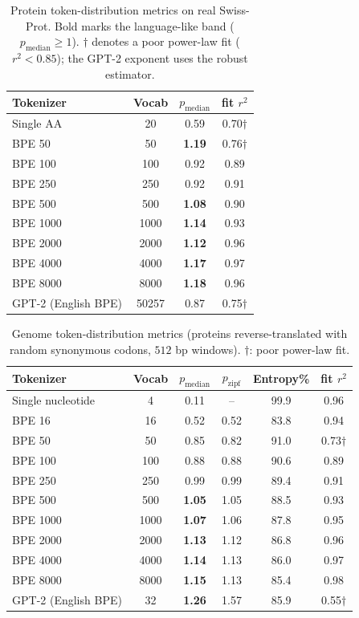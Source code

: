 \documentclass[11pt]{article}
\begin{document}
\begin{table}[t]
\centering
\caption{Protein token-distribution metrics on real Swiss-Prot. Bold marks the
language-like band ($p_\text{median} \ge 1$). $\dagger$ denotes a poor power-law
fit ($r^2 < 0.85$); the GPT-2 exponent uses the robust estimator.}
\label{tab:protein}
\begin{tabular}{lccc}
\toprule
Tokenizer & Vocab & $p_\text{median}$ & fit $r^2$ \\
\midrule
Single AA              & 20    & 0.59 & 0.70$\dagger$ \\
BPE 50                 & 50    & \textbf{1.19} & 0.76$\dagger$ \\
BPE 100                & 100   & 0.92 & 0.89 \\
BPE 250                & 250   & 0.92 & 0.91 \\
BPE 500                & 500   & \textbf{1.08} & 0.90 \\
BPE 1000               & 1000  & \textbf{1.14} & 0.93 \\
BPE 2000               & 2000  & \textbf{1.12} & 0.96 \\
BPE 4000               & 4000  & \textbf{1.17} & 0.97 \\
BPE 8000               & 8000  & \textbf{1.18} & 0.96 \\
GPT-2 (English BPE)    & 50257 & 0.87 & 0.75$\dagger$ \\
\bottomrule
\end{tabular}
\end{table}

\begin{table}[t]
\centering
\caption{Genome token-distribution metrics (proteins reverse-translated with
random synonymous codons, $512$ bp windows). $\dagger$: poor power-law fit.}
\label{tab:genome}
\begin{tabular}{lccccc}
\toprule
Tokenizer & Vocab & $p_\text{median}$ & $p_\text{zipf}$ & Entropy\% & fit $r^2$ \\
\midrule
Single nucleotide   & 4     & 0.11 & --   & 99.9 & 0.96 \\
BPE 16              & 16    & 0.52 & 0.52 & 83.8 & 0.94 \\
BPE 50              & 50    & 0.85 & 0.82 & 91.0 & 0.73$\dagger$ \\
BPE 100             & 100   & 0.88 & 0.88 & 90.6 & 0.89 \\
BPE 250             & 250   & 0.99 & 0.99 & 89.4 & 0.91 \\
BPE 500             & 500   & \textbf{1.05} & 1.05 & 88.5 & 0.93 \\
BPE 1000            & 1000  & \textbf{1.07} & 1.06 & 87.8 & 0.95 \\
BPE 2000            & 2000  & \textbf{1.13} & 1.12 & 86.8 & 0.96 \\
BPE 4000            & 4000  & \textbf{1.14} & 1.13 & 86.0 & 0.97 \\
BPE 8000            & 8000  & \textbf{1.15} & 1.13 & 85.4 & 0.98 \\
GPT-2 (English BPE) & 32    & \textbf{1.26} & 1.57 & 85.9 & 0.55$\dagger$ \\
\bottomrule
\end{tabular}
\end{table}
\end{document}
